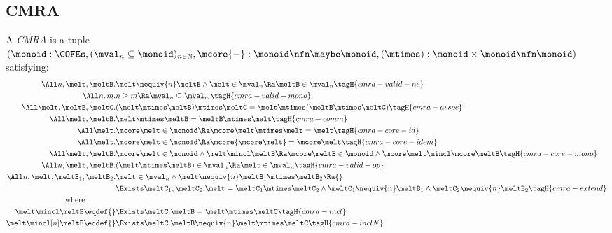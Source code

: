 \subsection{CMRA}

\begin{defn}
  A \emph{CMRA} is a tuple $(\monoid : \COFEs, (\mval_n \subseteq \monoid)_{n \in \mathbb{N}},\\ \mcore{{-}}: \monoid \nfn \maybe\monoid, (\mtimes) : \monoid \times \monoid \nfn \monoid)$ satisfying:
  \begin{align*}
    \All n, \melt, \meltB.& \melt \nequiv{n} \meltB \land \melt\in\mval_n \Ra \meltB\in\mval_n \tagH{cmra-valid-ne} \\
    \All n, m.& n \geq m \Ra \mval_n \subseteq \mval_m \tagH{cmra-valid-mono} \\
    \All \melt, \meltB, \meltC.& (\melt \mtimes \meltB) \mtimes \meltC = \melt \mtimes (\meltB \mtimes \meltC) \tagH{cmra-assoc} \\
    \All \melt, \meltB.& \melt \mtimes \meltB = \meltB \mtimes \melt \tagH{cmra-comm} \\
    \All \melt.& \mcore\melt \in \monoid \Ra \mcore\melt \mtimes \melt = \melt \tagH{cmra-core-id} \\
    \All \melt.& \mcore\melt \in \monoid \Ra \mcore{\mcore\melt} = \mcore\melt \tagH{cmra-core-idem} \\
    \All \melt, \meltB.& \mcore\melt \in \monoid \land \melt \mincl \meltB \Ra \mcore\meltB \in \monoid \land \mcore\melt \mincl \mcore\meltB \tagH{cmra-core-mono} \\
    \All n, \melt, \meltB.& (\melt \mtimes \meltB) \in \mval_n \Ra \melt \in \mval_n \tagH{cmra-valid-op} \\
    \All n, \melt, \meltB_1, \meltB_2.& \omit\rlap{$\melt \in \mval_n \land \melt \nequiv{n} \meltB_1 \mtimes \meltB_2 \Ra {}$} \\
    &\Exists \meltC_1, \meltC_2. \melt = \meltC_1 \mtimes \meltC_2 \land \meltC_1 \nequiv{n} \meltB_1 \land \meltC_2 \nequiv{n} \meltB_2 \tagH{cmra-extend} \\
    \text{where}\qquad\qquad\\
    \melt \mincl \meltB \eqdef{}& \Exists \meltC. \meltB = \melt \mtimes \meltC \tagH{cmra-incl} \\
    \melt \mincl[n] \meltB \eqdef{}& \Exists \meltC. \meltB \nequiv{n} \melt \mtimes \meltC \tagH{cmra-inclN}
  \end{align*}
\end{defn}

